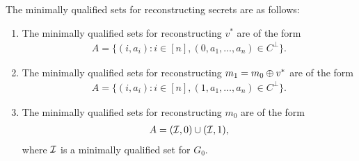 \begin{lemma}\label{lem:min-qual-secret}
	The minimally qualified sets for reconstructing secrets are as follows:
	\begin{enumerate}
		\item The minimally qualified sets for reconstructing $v^*$ are of the form
		\begin{align*}
			A = \{ (i,a_i)\colon i \in [n], (0,a_1,\dotsc, a_n) \in C^\perp \}.
		\end{align*}
		\item The minimally qualified sets for reconstructing $m_1 = m_0 \oplus v^*$ are of the form
		\begin{align*}
			A = \{ (i,a_i)\colon i \in [n], (1,a_1,\dotsc, a_n) \in C^\perp \}.
		\end{align*}
		\item The minimally qualified sets for reconstructing $m_0$ are of the form
		\begin{align*}
			A = ({\mathcal I},0) \cup ({\mathcal I}, 1),
		\end{align*}
		where ${\mathcal I}$ is a minimally qualified set for $G_0$.
	\end{enumerate}
\end{lemma}
